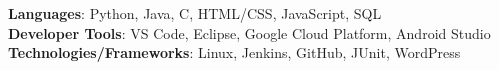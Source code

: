 \begin{itemize}[leftmargin=0.15in, label={}]
    \small{\item{
    \textbf{Languages}{: Python, Java, C, HTML/CSS, JavaScript, SQL} \\
    \textbf{Developer Tools}{: VS Code, Eclipse, Google Cloud Platform, Android Studio} \\
    \textbf{Technologies/Frameworks}{: Linux, Jenkins, GitHub, JUnit, WordPress} \\
    }}
\end{itemize}
\vspace{-16pt}

%
